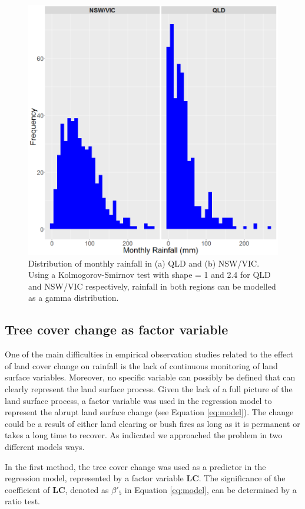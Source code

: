 \documentclass[fleqn,10pt,lineno]{wlpeerj} %
\begin{document}
\begin{figure}
\includegraphics[width=0.9\linewidth]{figures/hist_rainfall} \caption{Distribution of monthly rainfall in (a) QLD and (b) NSW/VIC. Using a Kolmogorov-Smirnov test with shape = 1 and 2.4  for QLD and NSW/VIC respectively, rainfall in both regions can be modelled as a gamma distribution.}\label{fig:hist-rain}
\end{figure}

\subsection{Tree cover change as factor variable}

One of the main difficulties in empirical observation studies related to
the effect of land cover change on rainfall is the lack of continuous
monitoring of land surface variables. Moreover, no specific variable can
possibly be defined that can clearly represent the land surface process.
Given the lack of a full picture of the land surface process, a factor
variable was used in the regression model to represent the abrupt land
surface change (see Equation \eqref{eq:model}). The change could be a
result of either land clearing or bush fires as long as it is permanent
or takes a long time to recover. As indicated we approached the problem
in two different models ways.

In the first method, the tree cover change was used as a predictor in
the regression model, represented by a factor variable \textbf{LC}. The
significance of the coefficient of \textbf{LC}, denoted as \(\beta'_5\)
in Equation \eqref{eq:model}, can be determined by a ratio test.
\end{document}

